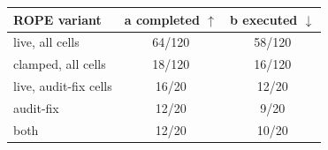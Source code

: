 \begin{tabular}{@{}lcc@{}}
\toprule
ROPE variant & a completed $\uparrow$ & b executed $\downarrow$ \\
\midrule
live, all cells & 64/120 & 58/120 \\
clamped, all cells & 18/120 & 16/120 \\
live, audit-fix cells & 16/20 & 12/20 \\
audit-fix & 12/20 & 9/20 \\
both & 12/20 & 10/20 \\
\bottomrule
\end{tabular}
